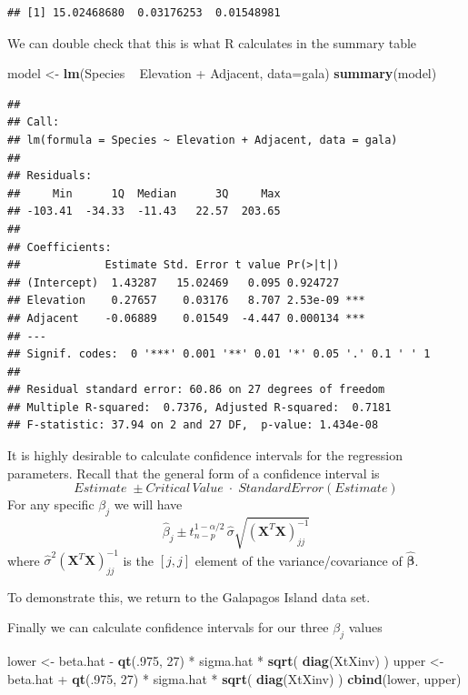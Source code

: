 \documentclass[]{book}
\newenvironment{Shaded}{\begin{snugshade}}{\end{snugshade}}
\newcommand{\KeywordTok}[1]{\textcolor[rgb]{0.13,0.29,0.53}{\textbf{{#1}}}}
\newcommand{\DataTypeTok}[1]{\textcolor[rgb]{0.13,0.29,0.53}{{#1}}}
\newcommand{\DecValTok}[1]{\textcolor[rgb]{0.00,0.00,0.81}{{#1}}}
\newcommand{\StringTok}[1]{\textcolor[rgb]{0.31,0.60,0.02}{{#1}}}
\newcommand{\NormalTok}[1]{{#1}}
\theoremstyle{definition}
\theoremstyle{definition}
\theoremstyle{remark}
\begin{document}
\begin{verbatim}
## [1] 15.02468680  0.03176253  0.01548981
\end{verbatim}

We can double check that this is what R calculates in the summary table

\begin{Shaded}
\begin{Highlighting}[]
\NormalTok{model <-}\StringTok{ }\KeywordTok{lm}\NormalTok{(Species ~}\StringTok{ }\NormalTok{Elevation +}\StringTok{ }\NormalTok{Adjacent, }\DataTypeTok{data=}\NormalTok{gala)}
\KeywordTok{summary}\NormalTok{(model)}
\end{Highlighting}
\end{Shaded}

\begin{verbatim}
## 
## Call:
## lm(formula = Species ~ Elevation + Adjacent, data = gala)
## 
## Residuals:
##     Min      1Q  Median      3Q     Max 
## -103.41  -34.33  -11.43   22.57  203.65 
## 
## Coefficients:
##             Estimate Std. Error t value Pr(>|t|)    
## (Intercept)  1.43287   15.02469   0.095 0.924727    
## Elevation    0.27657    0.03176   8.707 2.53e-09 ***
## Adjacent    -0.06889    0.01549  -4.447 0.000134 ***
## ---
## Signif. codes:  0 '***' 0.001 '**' 0.01 '*' 0.05 '.' 0.1 ' ' 1
## 
## Residual standard error: 60.86 on 27 degrees of freedom
## Multiple R-squared:  0.7376, Adjusted R-squared:  0.7181 
## F-statistic: 37.94 on 2 and 27 DF,  p-value: 1.434e-08
\end{verbatim}

It is highly desirable to calculate confidence intervals for the
regression parameters. Recall that the general form of a confidence
interval is
\[Estimate\;\pm Critical\,Value\;\cdot\;StandardError\left(Estimate\right)\]
For any specific \(\beta_{j}\) we will have
\[\hat{\beta}_{j}\pm t_{n-p}^{1-\alpha/2}\,\hat{\sigma}\sqrt{\left(\mathbf{X}^{T}\mathbf{X}\right)_{jj}^{-1}}\]
where
\(\hat{\sigma}^{2}\left(\mathbf{X}^{T}\mathbf{X}\right)_{jj}^{-1}\) is
the \([j,j]\) element of the variance/covariance of
\(\hat{\boldsymbol{\beta}}\).

To demonstrate this, we return to the Galapagos Island data set.

Finally we can calculate confidence intervals for our three
\(\beta_{j}\) values

\begin{Shaded}
\begin{Highlighting}[]
\NormalTok{lower <-}\StringTok{ }\NormalTok{beta.hat -}\StringTok{ }\KeywordTok{qt}\NormalTok{(.}\DecValTok{975}\NormalTok{, }\DecValTok{27}\NormalTok{) *}\StringTok{ }\NormalTok{sigma.hat *}\StringTok{ }\KeywordTok{sqrt}\NormalTok{( }\KeywordTok{diag}\NormalTok{(XtXinv) )}
\NormalTok{upper <-}\StringTok{ }\NormalTok{beta.hat +}\StringTok{ }\KeywordTok{qt}\NormalTok{(.}\DecValTok{975}\NormalTok{, }\DecValTok{27}\NormalTok{) *}\StringTok{ }\NormalTok{sigma.hat *}\StringTok{ }\KeywordTok{sqrt}\NormalTok{( }\KeywordTok{diag}\NormalTok{(XtXinv) )}
\KeywordTok{cbind}\NormalTok{(lower, upper)}
\end{Highlighting}
\end{Shaded}
\end{document}
